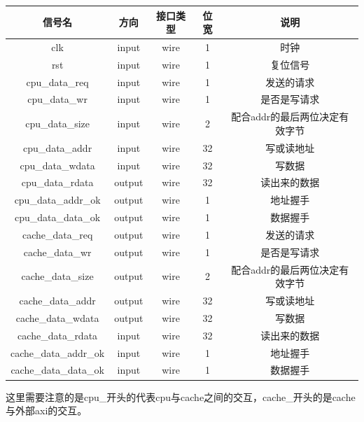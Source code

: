 \begin{table}[H]
    \centering
    \begin{tabular}{ccccc}
        \hline
        信号名 & 方向 & 接口类型 & 位宽 & 说明 \\\hline
        clk & input & wire & 1 & 时钟 \\ 
        rst & input & wire & 1 & 复位信号 \\ 
        cpu\_data\_req & input & wire & 1 & 发送的请求 \\ 
        cpu\_data\_wr & input & wire & 1 & 是否是写请求 \\ 
        cpu\_data\_size & input & wire & 2 & 配合addr的最后两位决定有效字节 \\ 
        cpu\_data\_addr & input & wire & 32 & 写或读地址 \\ 
        cpu\_data\_wdata & input & wire & 32 & 写数据 \\ 
        cpu\_data\_rdata & output & wire & 32 & 读出来的数据 \\ 
        cpu\_data\_addr\_ok & output & wire & 1 & 地址握手 \\ 
        cpu\_data\_data\_ok & output & wire & 1 & 数据握手 \\ 
        cache\_data\_req & output & wire & 1 & 发送的请求 \\ 
        cache\_data\_wr & output & wire & 1 & 是否是写请求 \\ 
        cache\_data\_size & output & wire & 2 & 配合addr的最后两位决定有效字节 \\ 
        cache\_data\_addr & output & wire & 32 & 写或读地址 \\ 
        cache\_data\_wdata & output & wire & 32 & 写数据 \\ 
        cache\_data\_rdata & input & wire & 32 & 读出来的数据 \\ 
        cache\_data\_addr\_ok & input & wire & 1 & 地址握手 \\ 
        cache\_data\_data\_ok & input & wire & 1 & 数据握手 \\ 

        \hline
    \end{tabular}
\end{table}

这里需要注意的是cpu\_开头的代表cpu与cache之间的交互，cache\_开头的是cache与外部axi的交互。

